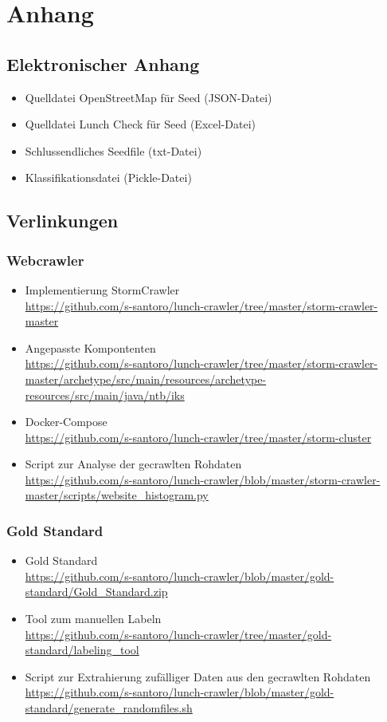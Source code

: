 \chapter{Anhang}
\section{Elektronischer Anhang}
\label{app:electronic}
\begin{itemize}
	\item Quelldatei OpenStreetMap für Seed (JSON-Datei)
	\item Quelldatei Lunch Check für Seed (Excel-Datei)
	\item Schlussendliches Seedfile (txt-Datei)
	\item Klassifikationsdatei (Pickle-Datei)
\end{itemize}
\section{Verlinkungen}
\subsection{Webcrawler}
\begin{itemize}
	\item Implementierung StormCrawler\\ \url{https://github.com/s-santoro/lunch-crawler/tree/master/storm-crawler-master}
	\item Angepasste Kompontenten\\
	\url{https://github.com/s-santoro/lunch-crawler/tree/master/storm-crawler-master/archetype/src/main/resources/archetype-resources/src/main/java/ntb/iks}
	\item Docker-Compose\\
	\url{https://github.com/s-santoro/lunch-crawler/tree/master/storm-cluster}
	\item Script zur Analyse der gecrawlten Rohdaten\\
	\url{https://github.com/s-santoro/lunch-crawler/blob/master/storm-crawler-master/scripts/website_histogram.py}
\end{itemize} 
\subsection{Gold Standard}
\label{app:gold_standard}
\begin{itemize}
	\item Gold Standard\\ 
	\url{https://github.com/s-santoro/lunch-crawler/blob/master/gold-standard/Gold_Standard.zip}
	\item Tool zum manuellen Labeln\\ 
	\url{https://github.com/s-santoro/lunch-crawler/tree/master/gold-standard/labeling_tool}
	\item Script zur Extrahierung zufälliger Daten aus den gecrawlten Rohdaten\\ 
	\url{https://github.com/s-santoro/lunch-crawler/blob/master/gold-standard/generate_randomfiles.sh}
\end{itemize} 
